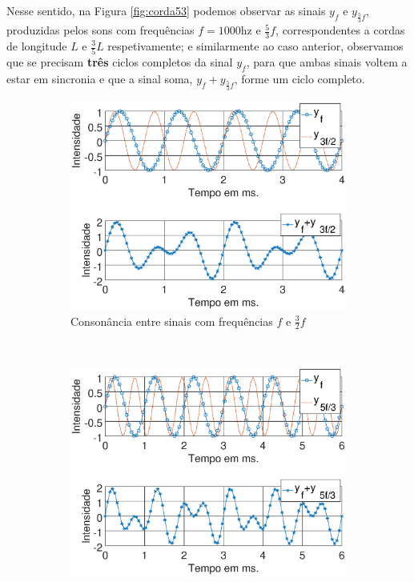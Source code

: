 Nesse sentido, na Figura \ref{fig:corda53} podemos observar as sinais $y_{f}$ e $y_{\frac{5}{3}f}$, 
produzidas pelos sons com frequências $f=1000$hz e $\frac{5}{3}f$,
correspondentes a cordas de longitude $L$ e $\frac{3}{5}L$ respetivamente;
e similarmente ao caso anterior, observamos que se precisam \textbf{três} ciclos completos da sinal $y_{f}$,
para que ambas sinais voltem a estar em sincronia e que a sinal soma, $y_{f}+y_{\frac{5}{3}f}$, forme um ciclo completo.

\begin{figure}
    \centering
    \begin{subfigure}[b]{0.6\textwidth}
        \includegraphics[width=\textwidth]{chapters/cap-musica-composer/consonancia32.eps}
        \caption{Consonância entre sinais com frequências $f$ e $\frac{3}{2}f$}
        \label{fig:corda32}
    \end{subfigure}
    ~ %
    \begin{subfigure}[b]{0.6\textwidth}
        \includegraphics[width=\textwidth]{chapters/cap-musica-composer/consonancia53.eps}

\end{subfigure}
\end{figure}
